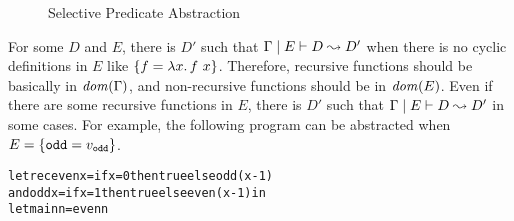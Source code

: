\begin{figure}[t]
\begin{minipage}{\textwidth}
 {}

\medskip

 {}

\medskip

  {}

%
\end{minipage}
\caption{Selective Predicate Abstraction}
\label{fig:abstraction}
\end{figure}

For some $D$ and $E$, there is $D'$ such that
${\Gamma} \mid {E} \vdash {D} \leadsto {D'}$ when there is no cyclic definitions in $E$
like $\{{f = \lambda{x}.\,{{f}~{x}}}\}$.  Therefore, recursive functions
should be basically in $\mathit{dom}(\Gamma)$, and non-recursive functions
should be in $\mathit{dom}(E)$.  Even if there are some recursive functions in
$E$, there is $D'$ such that ${\Gamma} \mid {E} \vdash {D} \leadsto {D'}$ in some cases.
For example, the following program can be abstracted when $E = \{{\texttt{odd} = v_\texttt{odd}}\}$.
\begin{alltt}
let rec even x = if x = 0 then true else odd (x-1)
    and odd x = if x = 1 then true else even (x-1) in
let main n = even n
\end{alltt}

